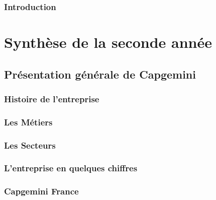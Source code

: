 \documentclass[twoside, 12pt]{report}
\begin{document}
\cleardoublepage
\setcounter{page}{1}
\section*{\textbf{Introduction}}
\label{sect:Introduction}



\part{Synthèse de la seconde année}

\chapter{Présentation générale de Capgemini}

    
    
    \section{Histoire de l'entreprise}
        
        
    
    \section{Les Métiers}
    
        
        
    \section{Les Secteurs}
    
        
    
    \section{L'entreprise en quelques chiffres}
    
        
        
    \section{Capgemini France}
    
        
        
\end{document}
